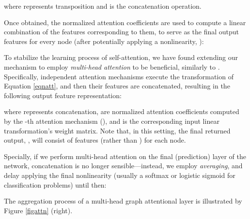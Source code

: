 \documentclass{article} \usepackage{iclr2018_conference,times}
\begin{document}
where  represents transposition and  is the concatenation operation.

Once obtained, the normalized attention coefficients are used to compute a linear combination of the features corresponding to them, to serve as the final output features for every node (after potentially applying a nonlinearity, ):


To stabilize the learning process of self-attention, we have found extending our mechanism to employ \emph{multi-head attention} to be beneficial, similarly to \cite{vaswani2017attention}. Specifically,  independent attention mechanisms execute the transformation of Equation \ref{eqnatt}, and then their features are concatenated, resulting in the following output feature representation:

where  represents concatenation,  are normalized attention coefficients computed by the -th attention mechanism (), and  is the corresponding input linear transformation's weight matrix. Note that, in this setting, the final returned output, , will consist of  features (rather than ) for each node.

Specially, if we perform multi-head attention on the final (prediction) layer of the network, concatenation is no longer sensible---instead, we employ \emph{averaging}, and delay applying the final nonlinearity (usually a softmax or logistic sigmoid for classification problems) until then:

The aggregation process of a multi-head graph attentional layer is illustrated by Figure \ref{figattn} (right).
\end{document}
